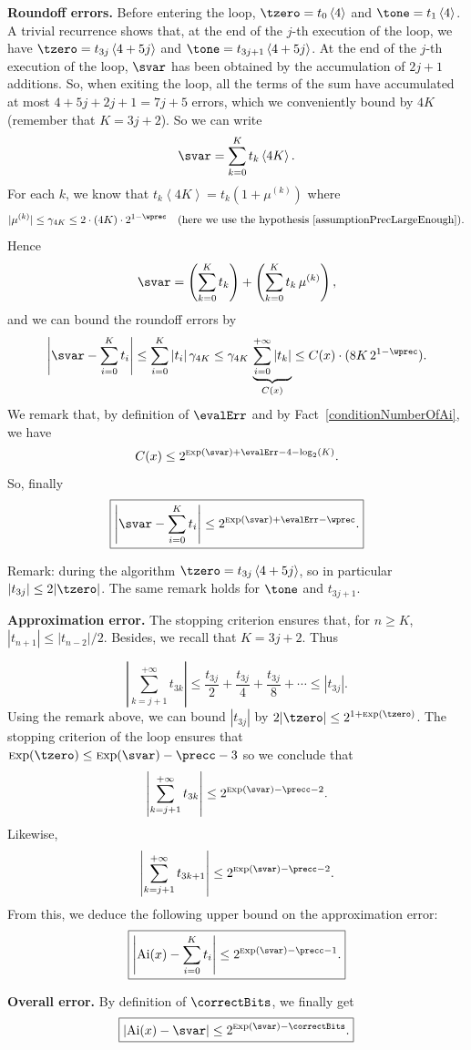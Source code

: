 \documentclass[12pt]{amsart}
\DeclareMathOperator{\Ai}{Ai}
\def\Exp{{\rm \textsc exp}}
\newcommand{\rnd}[1]{\left\langle#1\right\rangle}
\begin{document}
\noindent\textbf{Roundoff errors.}
Before entering the loop, $\tzero = t_0\rnd{4}$ and $\tone = t_1\rnd{4}$. A trivial recurrence shows that, at the end of the $j$-th execution of the loop, we have $\tzero = t_{3j}\rnd{4+5j}$ and $\tone = t_{3j+1}\rnd{4+5j}$. At the end of the $j$-th execution of the loop, $\svar$ has been obtained by the accumulation of $2j+1$ additions. So, when exiting the loop, all the terms of the sum have accumulated at most $4+5j+2j+1 = 7j+5$ errors, which we conveniently bound by $4K$ (remember that $K=3j+2$). So we can write
     $$  \svar = \sum_{k=0}^{K} t_{k}\rnd{4K}. $$
For each $k$, we know that $t_k\rnd{4K} = t_k(1+\mu^{(k)})$ where $$|\mu^{(k)}| \le \gamma_{4K} \le 2\cdot(4K)\cdot 2^{1-\wprec} \quad \text{(here we use the hypothesis~\ref{assumptionPrecLargeEnough}).}$$ Hence
$$  \svar = \left(\sum_{k=0}^{K} t_{k}\right) + \left(\sum_{k=0}^{K} t_{k}\,\mu^{(k)}\right),$$
and we can bound the roundoff errors by
$$ \left|\svar - \sum_{i=0}^K t_i \right| \le \sum_{i=0}^K |t_i|\,\gamma_{4K} \le \gamma_{4K}\,\underbrace{\sum_{i=0}^{+\infty} |t_k|}_{C(x)} \le C(x)\cdot(8K\,2^{1-\wprec}). $$
We remark that, by definition of $\evalErr$ and by Fact~\ref{conditionNumberOfAi}, we have $$C(x) \le 2^{\Exp(\svar) + \evalErr - 4 - \log_2(K)}.$$ So, finally
 $$\boxed{\left|\svar - \sum_{i=0}^K t_i \right| \le 2^{\Exp(\svar)+\evalErr-\wprec}.}$$

Remark: during the algorithm $\tzero = t_{3j}\rnd{4+5j}$, so in particular $|t_{3j}| \le 2|\tzero|$. The same remark holds for $\tone$ and $t_{3j+1}$.

\noindent \textbf{Approximation error.}
The stopping criterion ensures that, for $n \ge K$, $|t_{n+1}| \le |t_{n-2}|/2$. Besides, we recall that $K = 3j+2$. Thus

$$ \left|\sum_{k=j+1}^{+\infty} t_{3k}\right| \le \frac{t_{3j}}{2} + \frac{t_{3j}}{4} + \frac{t_{3j}}{8} + \cdots  \le |t_{3j}|.$$ 
Using the remark above, we can bound $|t_{3j}|$ by $2 |\tzero| \le 2^{1+\Exp(\tzero)}$. The stopping criterion of the loop ensures that $\Exp(\tzero) \le \Exp(\svar) - \precc - 3$ so we conclude that $$ \left|\sum_{k=j+1}^{+\infty} t_{3k}\right| \le 2^{\Exp(\svar)-\precc-2} .$$
Likewise, $$ \left|\sum_{k=j+1}^{+\infty} t_{3k+1}\right| \le 2^{\Exp(\svar)-\precc-2}.$$
From this, we deduce the following upper bound on the approximation error:
   $$\boxed{\left|\Ai(x)-\sum_{i=0}^K t_i\right| \le 2^{\Exp(\svar)-\precc-1}.}$$


\noindent\textbf{Overall error.}
By definition of $\correctBits$, we finally get
    $$\boxed{\left|\Ai(x)-\svar\right| \le 2^{\Exp(\svar)-\correctBits}.}$$
\end{document}
